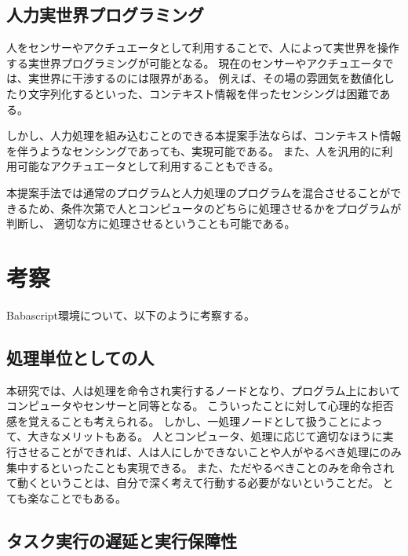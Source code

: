 \subsection{人力実世界プログラミング}\label{ux4ebaux529bux5b9fux4e16ux754cux30d7ux30edux30b0ux30e9ux30dfux30f3ux30b0}

人をセンサーやアクチュエータとして利用することで、人によって実世界を操作する実世界プログラミングが可能となる。
現在のセンサーやアクチュエータでは、実世界に干渉するのには限界がある。
例えば、その場の雰囲気を数値化したり文字列化するといった、コンテキスト情報を伴ったセンシングは困難である。

しかし、人力処理を組み込むことのできる本提案手法ならば、コンテキスト情報を伴うようなセンシングであっても、実現可能である。
また、人を汎用的に利用可能なアクチュエータとして利用することもできる。

本提案手法では通常のプログラムと人力処理のプログラムを混合させることができるため、条件次第で人とコンピュータのどちらに処理させるかをプログラムが判断し、
適切な方に処理させるということも可能である。

\section{考察}\label{ux8003ux5bdf}

Babascript環境について、以下のように考察する。

\subsection{処理単位としての人}\label{ux51e6ux7406ux5358ux4f4dux3068ux3057ux3066ux306eux4eba}

本研究では、人は処理を命令され実行するノードとなり、プログラム上においてコンピュータやセンサーと同等となる。
こういったことに対して心理的な拒否感を覚えることも考えられる。
しかし、一処理ノードとして扱うことによって、大きなメリットもある。
人とコンピュータ、処理に応じて適切なほうに実行させることができれば、人は人にしかできないことや人がやるべき処理にのみ集中するといったことも実現できる。
また、ただやるべきことのみを命令されて動くということは、自分で深く考えて行動する必要がないということだ。
とても楽なことでもある。

\subsection{タスク実行の遅延と実行保障性}\label{ux30bfux30b9ux30afux5b9fux884cux306eux9045ux5ef6ux3068ux5b9fux884cux4fddux969cux6027}

